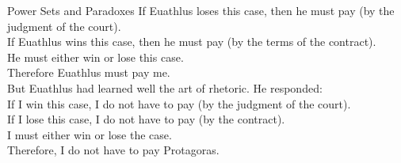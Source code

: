 \begin{section}{Power Sets and Paradoxes}
\noindent If Euathlus loses this case, then he must pay (by the judgment of the court).\\
If Euathlus wins this case, then he must pay (by the terms of the contract).\\
He must either win or lose this case.\\
Therefore Euathlus must pay me.\\

\noindent But Euathlus had learned well the art of rhetoric. He responded:\\

\noindent If I win this case, I do not have to pay (by the judgment of the court).\\
If I lose this case, I do not have to pay (by the contract).\\
I must either win or lose the case.\\
Therefore, I do not have to pay Protagoras.

\end{section}